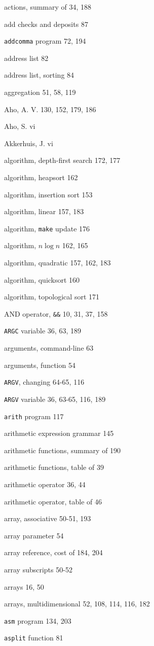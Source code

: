\begin{multicols}{2}
actions, summary of 34, 188

add checks and deposits 87

\verb'addcomma' program 72, 194

address list 82

address list, sorting 84

aggregation 51, 58, 119

Aho, A. V. 130, 152, 179, 186

Aho, S. vi

Akkerhuis, J. vi

algorithm, depth-first search 172, 177

algorithm, heapsort 162

algorithm, insertion sort 153

algorithm, linear 157, 183

algorithm, \verb'make' update 176

algorithm, $n\log n$ 162, 165

algorithm, quadratic 157, 162, 183

algorithm, quicksort 160

algorithm, topological sort 171

AND operator, \verb'&&' 10, 31, 37, 158

\verb'ARGC' variable 36, 63, 189

arguments, command-line 63

arguments, function 54

\verb'ARGV', changing 64-65, 116

\verb'ARGV' variable 36, 63-65, 116, 189

\verb'arith' program 117

arithmetic expression grammar 145

arithmetic functions, summary of 190

arithmetic functions, table of 39

arithmetic operator 36, 44

arithmetic operator, table of 46

array, associative 50-51, 193

array parameter 54

array reference, cost of 184, 204

array subscripts 50-52

arrays 16, 50

arrays, multidimensional 52, 108, 114, 116, 182

\verb'asm' program 134, 203

\verb'asplit' function 81


\end{multicols}
